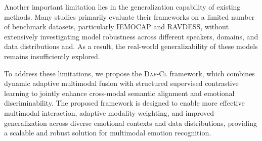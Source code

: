 Another important limitation lies in the generalization capability of existing methods. Many studies primarily evaluate their frameworks on a limited number of benchmark datasets, particularly IEMOCAP and RAVDESS, without extensively investigating model robustness across different speakers, domains, and data distributions\cite{Nguyen2024, Venkataramanan2019, Chen2020,Dikbiyik2025} and\cite{Krishna2020, KIM2026, Sebastian2019, qian2022, Kim2023, Shi2024, Li2025}. As a result, the real-world generalizability of these models remains insufficiently explored.

To address these limitations, we propose the \textsc{Daf-Cl} framework, which combines dynamic adaptive multimodal fusion with structured supervised contrastive learning to jointly enhance cross-modal semantic alignment and emotional discriminability. The proposed framework is designed to enable more effective multimodal interaction, adaptive modality weighting, and improved generalization across diverse emotional contexts and data distributions, providing a scalable and robust solution for multimodal emotion recognition.

